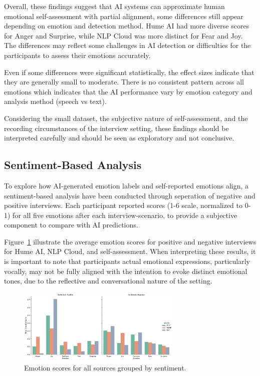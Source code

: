 \medskip
Overall, these findings suggest that AI systems can approximate human emotional self-assessment with partial alignment, some differences still appear depending on emotion and detection method. 
Hume AI had more diverse scores for Anger and Surprise, while NLP Cloud was more distinct for Fear and Joy. The differences may reflect some challenges in AI detection or difficulties for the participants to assess their emotions accurately. 

Even if some differences were significant statistically, the effect sizes indicate that they are generally small to moderate. There is no consistent pattern across all emotions which indicates that the AI performance vary by emotion category and analysis method (speech vs text).
\medskip

Considering the small dataset, the subjective nature of self-assessment, and the recording circumstances of the interview setting, these findings should be interpreted 
carefully and should be seen as exploratory and not conclusive. 


\subsection{Sentiment-Based Analysis}
To explore how AI-generated emotion labels and self-reported emotions align, a sentiment-based analysis have been conducted through seperation of negative and positive interviews. 
Each participant reported scores (1-6 scale, normalized to 0-1) for all five emotions after each interview-scenario, to provide a subjective component to compare with AI predictions.   

Figure~\ref{fig:sentiment-bar-rq3} illustrate the average emotion scores for positive and negative interviews for Hume AI, NLP Cloud, and self-assessment. 
When interpreting these results, it is important to note that participants actual emotional expressions, particularly vocally, may not be fully aligned with the intention to evoke distinct emotional tones, due to the reflective and conversational nature of the setting.
\begin{figure}[!h]
    \centering 
    \includegraphics[width=0.7\textwidth]{png/results/rq3/rq3_sentiment_grouped_bar.pdf}
    \caption{Emotion scores for all sources grouped by sentiment.}
    \label{fig:sentiment-bar-rq3}
\end{figure}

